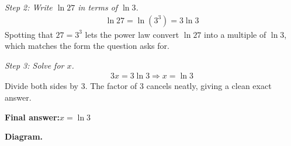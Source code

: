 \documentclass[11pt]{article}
\begin{document}
\textit{Step 2: Write \( \ln 27 \) in terms of \( \ln 3 \).}
\[\begin{gathered}
\ln 27 = \ln(3^3) = 3\ln 3
\end{gathered}\]
Spotting that \( 27 = 3^3 \) lets the power law convert \( \ln 27 \) into a multiple of \( \ln 3 \), which matches the form the question asks for.

\textit{Step 3: Solve for \( x \).}
\[\begin{gathered}
3x = 3\ln 3 \Rightarrow x = \ln 3
\end{gathered}\]
Divide both sides by 3. The factor of 3 cancels neatly, giving a clean exact answer.

\begin{answerbox}
\textbf{Final answer:}\quad \(\displaystyle  x = \ln 3 \)
\end{answerbox}
\textbf{Diagram.}
\end{document}
